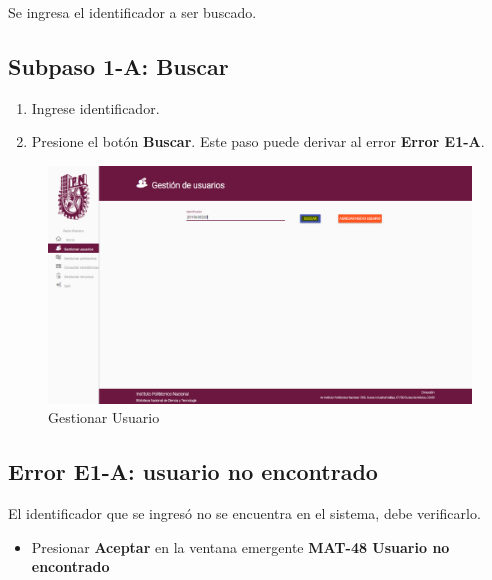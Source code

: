Se ingresa el identificador a ser buscado.
\subsection{Subpaso 1-A: Buscar }
\begin{enumerate}
	\item Ingrese identificador.
	\item Presione el botón \textbf{Buscar}. Este paso puede derivar
		al error \textbf{Error E1-A}.

\end{enumerate}

\begin{figure}[hbtp]
		\centering
		\includegraphics[scale=0.3]{images/Interfaz/IUGS22_gestionarUsuarioBuscar.png}
		\caption{Gestionar Usuario}
	\end{figure}

\subsection{Error E1-A: usuario no encontrado}
El identificador que se ingresó no se encuentra  en el sistema,
debe verificarlo.
\begin{itemize}
	\item Presionar \textbf{Aceptar} en la ventana emergente 
		\textbf{MAT-48 Usuario no encontrado}
		

\end{itemize}
